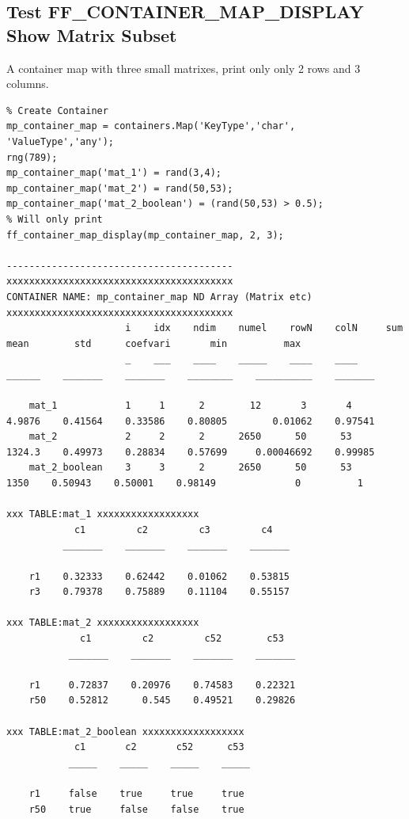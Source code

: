 \documentclass[
]{book}
\begin{document}
\hypertarget{test-ff_container_map_display-show-matrix-subset}{%
\subsection{Test FF\_CONTAINER\_MAP\_DISPLAY Show Matrix Subset}\label{test-ff_container_map_display-show-matrix-subset}}

A container map with three small matrixes, print only only 2 rows and 3
columns.

\begin{verbatim}
% Create Container
mp_container_map = containers.Map('KeyType','char', 'ValueType','any');
rng(789);
mp_container_map('mat_1') = rand(3,4);
mp_container_map('mat_2') = rand(50,53);
mp_container_map('mat_2_boolean') = (rand(50,53) > 0.5);
% Will only print 
ff_container_map_display(mp_container_map, 2, 3);

----------------------------------------
xxxxxxxxxxxxxxxxxxxxxxxxxxxxxxxxxxxxxxxx
CONTAINER NAME: mp_container_map ND Array (Matrix etc)
xxxxxxxxxxxxxxxxxxxxxxxxxxxxxxxxxxxxxxxx
                     i    idx    ndim    numel    rowN    colN     sum       mean        std      coefvari       min          max  
                     _    ___    ____    _____    ____    ____    ______    _______    _______    ________    __________    _______

    mat_1            1     1      2        12       3       4     4.9876    0.41564    0.33586    0.80805        0.01062    0.97541
    mat_2            2     2      2      2650      50      53     1324.3    0.49973    0.28834    0.57699     0.00046692    0.99985
    mat_2_boolean    3     3      2      2650      50      53       1350    0.50943    0.50001    0.98149              0          1

xxx TABLE:mat_1 xxxxxxxxxxxxxxxxxx
            c1         c2         c3         c4   
          _______    _______    _______    _______

    r1    0.32333    0.62442    0.01062    0.53815
    r3    0.79378    0.75889    0.11104    0.55157

xxx TABLE:mat_2 xxxxxxxxxxxxxxxxxx
             c1         c2         c52        c53  
           _______    _______    _______    _______

    r1     0.72837    0.20976    0.74583    0.22321
    r50    0.52812      0.545    0.49521    0.29826

xxx TABLE:mat_2_boolean xxxxxxxxxxxxxxxxxx
            c1       c2       c52      c53 
           _____    _____    _____    _____

    r1     false    true     true     true 
    r50    true     false    false    true
\end{verbatim}
\end{document}
